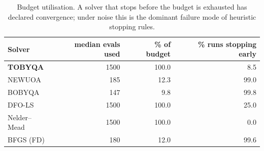 \begin{table}[t]\centering\small
\caption{Budget utilisation. A solver that stops before the budget is exhausted has declared convergence; under noise this is the dominant failure mode of heuristic stopping rules.}
\label{tab:budget}
\begin{tabular}{lrrr}\toprule
Solver & median evals used & \% of budget & \% runs stopping early \\\midrule
\textbf{TOBYQA} & 1500 & 100.0 & 8.5 \\
NEWUOA & 185 & 12.3 & 99.0 \\
BOBYQA & 147 & 9.8 & 99.8 \\
DFO-LS & 1500 & 100.0 & 25.0 \\
Nelder--Mead & 1500 & 100.0 & 0.0 \\
BFGS (FD) & 180 & 12.0 & 99.6 \\
\bottomrule\end{tabular}\end{table}